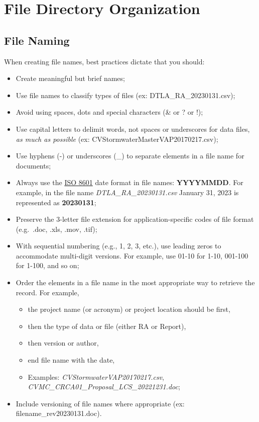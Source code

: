 \documentclass[
]{book}
\providecommand{\tightlist}{%
  \setlength{\itemsep}{0pt}\setlength{\parskip}{0pt}}
\begin{document}
\hypertarget{organization}{%
\chapter{File Directory Organization}\label{organization}}

\hypertarget{file-naming}{%
\section{File Naming}\label{file-naming}}

When creating file names, best practices dictate that you should:

\begin{itemize}
\tightlist
\item
  Create meaningful but brief names;
\item
  Use file names to classify types of files (ex: DTLA\_RA\_20230131.csv);
\item
  Avoid using spaces, dots and special characters (\& or ? or !);
\item
  Use capital letters to delimit words, not spaces or underscores for data files, \emph{as much as possible} (ex: CVStormwaterMasterVAP20170217.csv);
\item
  Use hyphens (-) or underscores (\_) to separate elements in a file name for documents;
\item
  Always use the \href{https://www.iso.org/iso-8601-date-and-time-format.html}{ISO 8601} date format in file names: \textbf{YYYYMMDD}. For example, in the file name \emph{DTLA\_RA\_20230131.csv} January 31, 2023 is represented as \textbf{20230131};
\item
  Preserve the 3-letter file extension for application-specific codes of file format (e.g.~.doc, .xls, .mov, .tif);
\item
  With sequential numbering (e.g., 1, 2, 3, etc.), use leading zeros to accommodate multi-digit versions. For example, use 01-10 for 1-10, 001-100 for 1-100, and so on;
\item
  Order the elements in a file name in the most appropriate way to retrieve the record. For example,

  \begin{itemize}
  \tightlist
  \item
    the project name (or acronym) or project location should be first,
  \item
    then the type of data or file (either RA or Report),
  \item
    then version or author,
  \item
    end file name with the date,
  \item
    Examples: \emph{CVStormwaterVAP20170217.csv}, \emph{CVMC\_CRCA01\_Proposal\_LCS\_20221231.doc};
  \end{itemize}
\item
  Include versioning of file names where appropriate (ex: filename\_rev20230131.doc).
\end{itemize}
\end{document}
